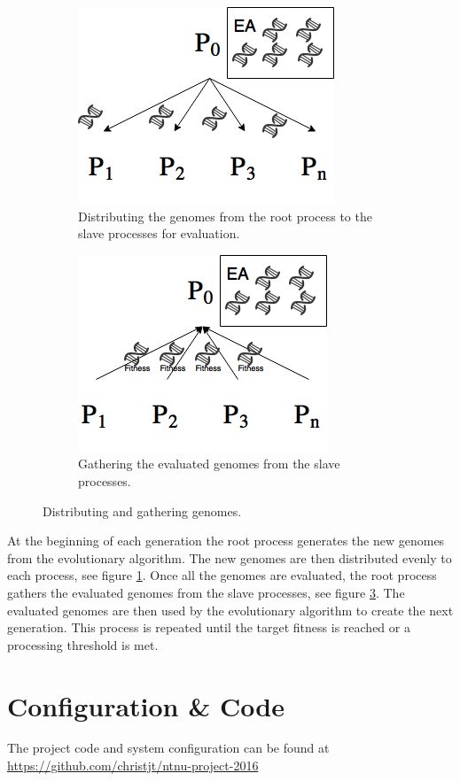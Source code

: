\begin{figure}[H]
	\centering
	\begin{subfigure}[t]{0.45\textwidth}
		\centering
		\includegraphics[scale=0.5]{chapters/res/mpi-distribute.png}
		\caption{Distributing the genomes from the root process to the slave processes for evaluation.}
		\label{fig:distribute-genomes}
	\end{subfigure}
	\begin{subfigure}[t]{0.45\textwidth}
		\centering
		\includegraphics[scale=0.5]{chapters/res/mpi-gather.png}
		\caption{Gathering the evaluated genomes from the slave processes.}
		\label{fig:gather-genomes}
	\end{subfigure}
	\caption{Distributing and gathering genomes.}
\end{figure}
At the beginning of each generation the root process generates the new genomes from the evolutionary algorithm.
The new genomes are then distributed evenly to each process, see figure \ref{fig:distribute-genomes}.
Once all the genomes are evaluated, the root process gathers the evaluated genomes from the slave processes, see figure \ref{fig:gather-genomes}.
The evaluated genomes are then used by the evolutionary algorithm to create the next generation.
This process is repeated until the target fitness is reached or a processing threshold is met. 

\chapter{Configuration \&  Code}

The project code and system configuration can be found at \url{https://github.com/christjt/ntnu-project-2016}





